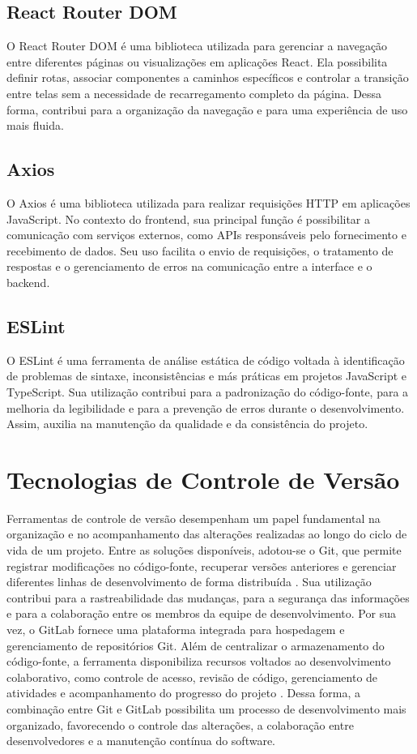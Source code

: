 \subsection{React Router DOM}
O React Router DOM é uma biblioteca utilizada para gerenciar a navegação entre diferentes páginas ou visualizações em aplicações React. Ela possibilita definir rotas, associar componentes a caminhos específicos e controlar a transição entre telas sem a necessidade de recarregamento completo da página. Dessa forma, contribui para a organização da navegação e para uma experiência de uso mais fluida.

\subsection{Axios}
O Axios é uma biblioteca utilizada para realizar requisições HTTP em aplicações JavaScript. No contexto do frontend, sua principal função é possibilitar a comunicação com serviços externos, como APIs responsáveis pelo fornecimento e recebimento de dados. Seu uso facilita o envio de requisições, o tratamento de respostas e o gerenciamento de erros na comunicação entre a interface e o backend.

\subsection{ESLint}
O ESLint é uma ferramenta de análise estática de código voltada à identificação de problemas de sintaxe, inconsistências e más práticas em projetos JavaScript e TypeScript. Sua utilização contribui para a padronização do código-fonte, para a melhoria da legibilidade e para a prevenção de erros durante o desenvolvimento. Assim, auxilia na manutenção da qualidade e da consistência do projeto.

\section{Tecnologias de Controle de Versão}
Ferramentas de controle de versão desempenham um papel fundamental na organização e no acompanhamento das alterações realizadas ao longo do ciclo de vida de um projeto. Entre as soluções disponíveis, adotou-se o Git, que permite registrar modificações no código-fonte, recuperar versões anteriores e gerenciar diferentes linhas de desenvolvimento de forma distribuída \cite{chacon2014}. Sua utilização contribui para a rastreabilidade das mudanças, para a segurança das informações e para a colaboração entre os membros da equipe de desenvolvimento.
Por sua vez, o GitLab fornece uma plataforma integrada para hospedagem e gerenciamento de repositórios Git. Além de centralizar o armazenamento do código-fonte, a ferramenta disponibiliza recursos voltados ao desenvolvimento colaborativo, como controle de acesso, revisão de código, gerenciamento de atividades e acompanhamento do progresso do projeto \cite{gitlab2026}. Dessa forma, a combinação entre Git e GitLab possibilita um processo de desenvolvimento mais organizado, favorecendo o controle das alterações, a colaboração entre desenvolvedores e a manutenção contínua do software.

